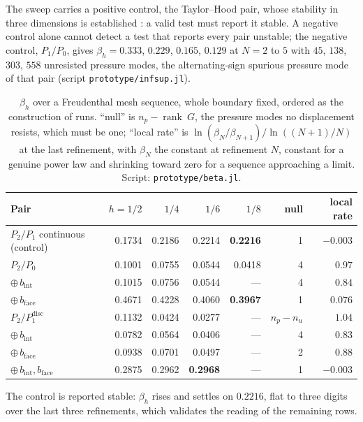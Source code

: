 \documentclass{article}
\newcommand{\code}[1]{\texttt{#1}}
\theoremstyle{definition}
\theoremstyle{plain}
\begin{document}
The sweep carries a positive control, the Taylor--Hood pair, whose stability
in three dimensions is established \cite{BoffiBrezziFortin:2013}: a valid
test must report it stable. A negative control alone cannot detect a test that
reports every pair unstable; the negative control, $P_1/P_0$, gives
$\beta_h = 0.333$, $0.229$, $0.165$, $0.129$ at $N = 2$ to $5$ with $45$,
$138$, $303$, $558$ unresisted pressure modes, the alternating-sign spurious
pressure mode of that pair (script \code{prototype/infsup.jl}).

\begin{table}[h]
\centering
\begin{tabular}{@{}lrrrrrr@{}}
\toprule
Pair & $h = 1/2$ & $1/4$ & $1/6$ & $1/8$ & null & local rate \\
\midrule
$P_2/P_1$ continuous (control) & 0.1734 & 0.2186 & 0.2214 & \textbf{0.2216} & 1 & $-0.003$ \\
\midrule
$P_2/P_0$                      & 0.1001 & 0.0755 & 0.0544 & 0.0418 & 4 & $0.97$ \\
$\oplus\, b_{\mathrm{int}}$    & 0.1015 & 0.0756 & 0.0544 & --- & 4 & $0.84$ \\
$\oplus\, b_{\mathrm{face}}$   & 0.4671 & 0.4228 & 0.4060 & \textbf{0.3967} & 1 & $0.076$ \\
\midrule
$P_2/P_1^{\mathrm{disc}}$      & 0.1132 & 0.0424 & 0.0277 & --- & $n_p - n_u$ & $1.04$ \\
$\oplus\, b_{\mathrm{int}}$    & 0.0782 & 0.0564 & 0.0406 & --- & 4 & $0.83$ \\
$\oplus\, b_{\mathrm{face}}$   & 0.0938 & 0.0701 & 0.0497 & --- & 2 & $0.88$ \\
$\oplus\, b_{\mathrm{int}}, b_{\mathrm{face}}$
                               & 0.2875 & 0.2962 & \textbf{0.2968} & --- & 1 & $-0.003$ \\
\bottomrule
\end{tabular}
\caption{$\beta_h$ over a Freudenthal mesh sequence, whole boundary fixed, ordered as
the construction of \textcite[Example~8.7.2]{BoffiBrezziFortin:2013} runs. ``null''
is $n_p - \operatorname{rank}~G$, the pressure modes no displacement resists,
which must be one; ``local rate'' is $\ln(\beta_N/\beta_{N+1})/\ln((N+1)/N)$
at the last refinement, with $\beta_N$ the constant at refinement $N$, constant for a genuine power law and shrinking toward
zero for a sequence approaching a limit. Script: \code{prototype/beta.jl}.}
\label{tab:beta}
\end{table}

The control is reported stable: $\beta_h$ rises and settles on $0.2216$, flat
to three digits over the last three refinements, which validates the reading
of the remaining rows.
\end{document}
